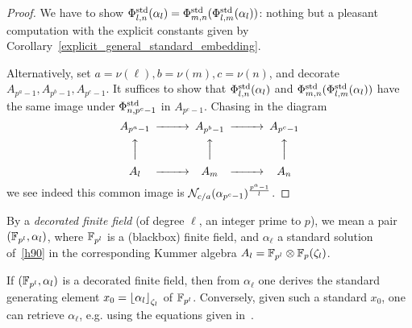 \documentclass{sig-alternate}
\begin{document}
\begin{proof}
We have to show ${\Phi^{\textrm{std}}_{{l},{n}}}(\alpha_l)={\Phi^{\textrm{std}}_{{m},{n}}}({\Phi^{\textrm{std}}_{{l},{m}}}(\alpha_l))$:
nothing but a pleasant computation with the explicit constants given 
by Corollary~\ref{explicit_general_standard_embedding}.

Alternatively, set $a=\nu(\ell),b=\nu(m),c=\nu(n)$, and decorate $A_{p^a-1},A_{p^b-1},A_{p^c-1}$.
It suffices to show that ${\Phi^{\textrm{std}}_{{l},{n}}}(\alpha_l)$
and ${\Phi^{\textrm{std}}_{{m},{n}}}({\Phi^{\textrm{std}}_{{l},{m}}}(\alpha_l))$ have the same image under ${\Phi^{\textrm{std}}_{{n},{p^c-1}}}$
in $A_{p^c-1}$.
Chasing in the diagram
\begin{equation*}
\begin{CD}
A_{p^a-1} @>>> A_{p^b-1} @>>> A_{p^c-1} \\
@AAA @AAA @AAA\\
A_\ell @>>> A_m @>>> A_n
\end{CD}
\end{equation*}
we see indeed this common image
is $\mathcal{N}_{c/a}(\alpha_{p^c-1})^{\frac{p^a-1}{l}}$.
\end{proof}

By a \emph{decorated finite field} (of degree $\ell$, an integer prime to $p$),
we mean a pair $(\mathbb{F}_{p^l},\alpha_l)$,
where $\mathbb{F}_{p^l}$ is a (blackbox) finite field,
and $\alpha_\ell$ a standard solution of~\eqref{h90} in the corresponding
Kummer algebra $A_l=\mathbb{F}_{p^l}\otimes\mathbb{F}_{p}(\zeta_l)$.

If $(\mathbb{F}_{p^l},\alpha_l)$ is a decorated finite field,
then from $\alpha_\ell$ one derives the standard generating
element $x_0=\left\lfloor \alpha_l \right\rfloor_{\zeta_l}$ of $\mathbb{F}_{p^l}$.
Conversely, given such a standard $x_0$, one can retrieve $\alpha_\ell$,
e.g. using the equations given in~\cite{Allombert02}.
\end{document}
